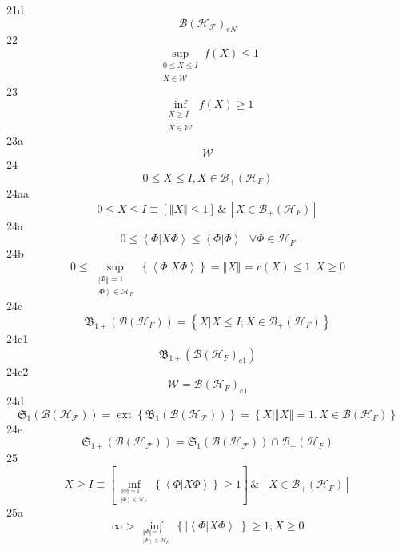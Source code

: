 \documentclass[aps,preprint]{revtex4}%
\begin{document}
21d%
\[
\mathcal{B}\left(  \mathcal{H}_{\mathcal{F}}\right)  _{eN}%
\]
22%
\[
\sup_{\substack{0\leq X\leq I\\\\X\in\mathcal{W}}}f\left(  X\right)  \leq1
\]
23%
\[
\inf_{\substack{X\geq I\\\\X\in\mathcal{W}}}f\left(  X\right)  \geq1
\]
23a%
\[
\mathcal{W}%
\]
24%
\[
0\leq X\leq I,X\in\mathcal{B}_{+}\left(  \mathcal{H}_{F}\right)
\]
24aa%
\[
0\leq X\leq I\equiv\left[  \left\Vert X\right\Vert \leq1\right]  \,\&\,\left[
X\in\mathcal{B}_{+}\left(  \mathcal{H}_{F}\right)  \right]
\]
24a%
\[
0\leq\left\langle \left.  \Phi\right\vert X\Phi\right\rangle \leq\left\langle
\left.  \Phi\right\vert \Phi\right\rangle \text{ }\forall\Phi\in
\mathcal{H}_{F}%
\]
24b%
\[
0\leq\sup_{\substack{\left\Vert \Phi\right\Vert =1\\\left\vert \Phi
\right\rangle \in\mathcal{H}_{F}}}\left\{  \left\langle \left.  \Phi
\right\vert X\Phi\right\rangle \right\}  =\left\Vert X\right\Vert =r\left(
X\right)  \leq1;X\geq0
\]
24c%
\[
\mathfrak{B}_{1+}\left(  \mathcal{B}\left(  \mathcal{H}_{F}\right)  \right)
=\left\{  \left.  X\right\vert X\leq I;X\in\mathcal{B}_{+}\left(
\mathcal{H}_{F}\right)  \right\}
\]
24c1%
\[
\mathfrak{B}_{1+}\left(  \mathcal{B}\left(  \mathcal{H}_{F}\right)
_{e1}\right)
\]
24c2%
\[
\mathcal{W}=\mathcal{B}\left(  \mathcal{H}_{F}\right)  _{e1}%
\]
24d%
\[
\mathfrak{S}_{1}\left(  \mathcal{B}\left(  \mathcal{H}_{\mathcal{F}}\right)
\right)  =\operatorname*{ext}\left\{  \mathfrak{B}_{1}\left(  \mathcal{B}%
\left(  \mathcal{H}_{\mathcal{F}}\right)  \right)  \right\}  =\left\{
X\left\vert \left\Vert X\right\Vert =1,X\in\mathcal{B}\left(  \mathcal{H}%
_{F}\right)  \right.  \right\}
\]
24e%
\[
\mathfrak{S}_{1+}\left(  \mathcal{B}\left(  \mathcal{H}_{\mathcal{F}}\right)
\right)  =\mathfrak{S}_{1}\left(  \mathcal{B}\left(  \mathcal{H}_{\mathcal{F}%
}\right)  \right)  \cap\mathcal{B}_{+}\left(  \mathcal{H}_{F}\right)
\]
25%
\[
X\geq I\equiv\left[  \inf_{_{\substack{\left\Vert \Phi\right\Vert
=1\\\left\vert \Phi\right\rangle \in\mathcal{H}_{F}}}}\left\{  \left\langle
\left.  \Phi\right\vert X\Phi\right\rangle \right\}  \geq1\right]
\,\&\,\left[  X\in\mathcal{B}_{+}\left(  \mathcal{H}_{F}\right)  \right]
\]
25a%
\[
\infty>\inf_{_{\substack{\left\Vert \Phi\right\Vert =1\\\left\vert
\Phi\right\rangle \in\mathcal{H}_{F}}}}\left\{  \left\vert \left\langle
\left.  \Phi\right\vert X\Phi\right\rangle \right\vert \right\}  \geq1;X\geq0
\]
\end{document}
